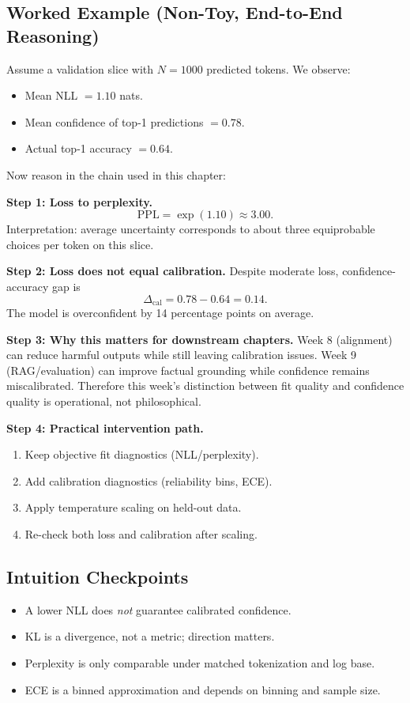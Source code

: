 \subsection*{Worked Example (Non-Toy, End-to-End Reasoning)}
Assume a validation slice with $N=1000$ predicted tokens. We observe:
\begin{itemize}[leftmargin=1.5em]
  \item Mean NLL $=1.10$ nats.
  \item Mean confidence of top-1 predictions $=0.78$.
  \item Actual top-1 accuracy $=0.64$.
\end{itemize}
Now reason in the chain used in this chapter:

\textbf{Step 1: Loss to perplexity.}
\[
\mathrm{PPL}=\exp(1.10)\approx 3.00.
\]
Interpretation: average uncertainty corresponds to about three equiprobable choices per token on this slice.

\textbf{Step 2: Loss does not equal calibration.}  
Despite moderate loss, confidence-accuracy gap is
\[
\Delta_{\mathrm{cal}} = 0.78 - 0.64 = 0.14.
\]
The model is overconfident by 14 percentage points on average.

\textbf{Step 3: Why this matters for downstream chapters.}  
Week 8 (alignment) can reduce harmful outputs while still leaving calibration issues.  
Week 9 (RAG/evaluation) can improve factual grounding while confidence remains miscalibrated.  
Therefore this week's distinction between fit quality and confidence quality is operational, not philosophical.

\textbf{Step 4: Practical intervention path.}
\begin{enumerate}[leftmargin=1.5em]
  \item Keep objective fit diagnostics (NLL/perplexity).
  \item Add calibration diagnostics (reliability bins, ECE).
  \item Apply temperature scaling on held-out data.
  \item Re-check both loss and calibration after scaling.
\end{enumerate}

\subsection*{Intuition Checkpoints}
\begin{itemize}[leftmargin=1.5em]
  \item A lower NLL does \emph{not} guarantee calibrated confidence.
  \item KL is a divergence, not a metric; direction matters.
  \item Perplexity is only comparable under matched tokenization and log base.
  \item ECE is a binned approximation and depends on binning and sample size.
\end{itemize}

